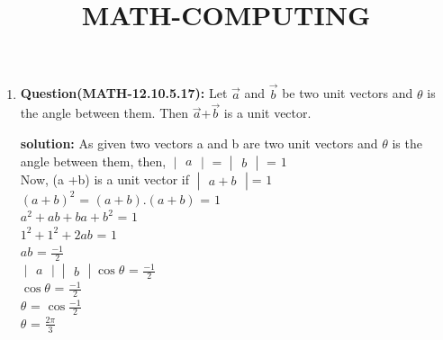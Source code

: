 \documentclass[12pt]{article}
\newcommand{\mydet}[1]{\ensuremath{\begin{vmatrix}#1\end{vmatrix}}}
\begin{document}
\title{\textbf{MATH-COMPUTING}}
\maketitle
\begin{enumerate}
    \item \textbf{Question(MATH-12.10.5.17):}
    Let $\vec{a}$ and $\vec{b}$ be two unit vectors and $\theta$ is the angle between them. Then $\vec{a}$+$\vec{b}$ is a unit vector.

 \textbf{solution:}
  As given two vectors a and b are two unit vectors and $\theta$ is the angle between them,   
  then, $\mydet{a}$ = $\mydet{b}$ = $1$\\
   Now, (a +b) is a unit vector if
 $\mydet{a + b}$= $1$\\
   $(a+b)^2$ = $(a +b).(a + b)$ = $1$\\
$a^2 + ab +ba +b^2$ = $1$\\
$1^2 + 1^2 +2ab$ = $1$\\
 $ab$ = $\frac{-1}{2}$\\
$\mydet{a}\mydet{b} \cos\theta$ = $\frac{-1}{2}$\\
$\cos\theta$ = $\frac{-1}{2}$\\
$\theta$ = $\cos\frac{-1}{2}$\\
 $\theta$ = $\frac{2\pi}{3}$\\
  \end{enumerate}
\end{document}
